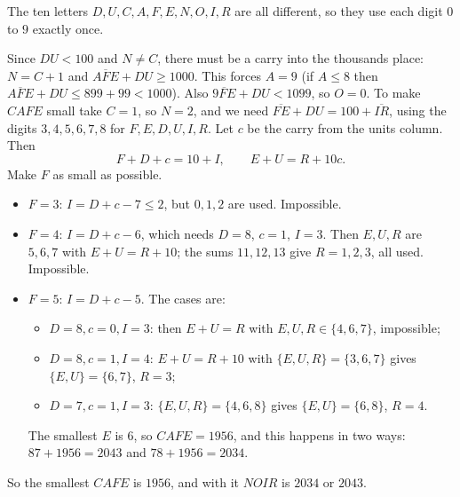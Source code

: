 The ten letters $D,U,C,A,F,E,N,O,I,R$ are all different, so they use each digit $0$ to $9$ exactly once.

Since $DU<100$ and $N\ne C$, there must be a carry into the thousands place: $N=C+1$ and $\overline{AFE}+DU\ge1000$. This forces $A=9$ (if $A\le8$ then $\overline{AFE}+DU\le899+99<1000$). Also $\overline{9FE}+DU<1099$, so $O=0$. To make $CAFE$ small take $C=1$, so $N=2$, and we need $\overline{FE}+DU=100+\overline{IR}$, using the digits $3,4,5,6,7,8$ for $F,E,D,U,I,R$. Let $c$ be the carry from the units column. Then
\[
F+D+c=10+I,\qquad E+U=R+10c .
\]
Make $F$ as small as possible.
\begin{itemize}
\item $F=3$: $I=D+c-7\le2$, but $0,1,2$ are used. Impossible.
\item $F=4$: $I=D+c-6$, which needs $D=8$, $c=1$, $I=3$. Then $E,U,R$ are $5,6,7$ with $E+U=R+10$; the sums $11,12,13$ give $R=1,2,3$, all used. Impossible.
\item $F=5$: $I=D+c-5$. The cases are:
 \begin{itemize}
 \item $D=8,c=0,I=3$: then $E+U=R$ with $E,U,R\in\{4,6,7\}$, impossible;
 \item $D=8,c=1,I=4$: $E+U=R+10$ with $\{E,U,R\}=\{3,6,7\}$ gives $\{E,U\}=\{6,7\}$, $R=3$;
 \item $D=7,c=1,I=3$: $\{E,U,R\}=\{4,6,8\}$ gives $\{E,U\}=\{6,8\}$, $R=4$.
 \end{itemize}
The smallest $E$ is $6$, so $CAFE=1956$, and this happens in two ways: $87+1956=2043$ and $78+1956=2034$.
\end{itemize}
So the smallest $CAFE$ is $\boxed{1956}$, and with it $NOIR$ is $\boxed{2034\text{ or }2043}$.
